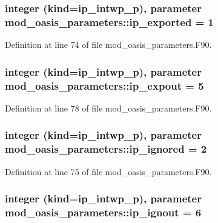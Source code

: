 \hypertarget{classmod__oasis__parameters_a0f729cda95773cdc8df800eacdceb606}{
\subsubsection[{ip\+\_\+exported}]{\setlength{\rightskip}{0pt plus 5cm}integer (kind=ip\+\_\+intwp\+\_\+p), parameter mod\+\_\+oasis\+\_\+parameters\+::ip\+\_\+exported = 1}}\label{classmod__oasis__parameters_a0f729cda95773cdc8df800eacdceb606}


Definition at line 74 of file mod\+\_\+oasis\+\_\+parameters.\+F90.

\hypertarget{classmod__oasis__parameters_ae91d5161b091e1f07e6ee64a38514df6}{
\subsubsection[{ip\+\_\+expout}]{\setlength{\rightskip}{0pt plus 5cm}integer (kind=ip\+\_\+intwp\+\_\+p), parameter mod\+\_\+oasis\+\_\+parameters\+::ip\+\_\+expout = 5}}\label{classmod__oasis__parameters_ae91d5161b091e1f07e6ee64a38514df6}


Definition at line 78 of file mod\+\_\+oasis\+\_\+parameters.\+F90.

\hypertarget{classmod__oasis__parameters_ae3733a399c07b165b5ad19543ca1d2a2}{
\subsubsection[{ip\+\_\+ignored}]{\setlength{\rightskip}{0pt plus 5cm}integer (kind=ip\+\_\+intwp\+\_\+p), parameter mod\+\_\+oasis\+\_\+parameters\+::ip\+\_\+ignored = 2}}\label{classmod__oasis__parameters_ae3733a399c07b165b5ad19543ca1d2a2}


Definition at line 75 of file mod\+\_\+oasis\+\_\+parameters.\+F90.

\hypertarget{classmod__oasis__parameters_a4d283e27ebb49e8d97a35842f10d9aec}{
\subsubsection[{ip\+\_\+ignout}]{\setlength{\rightskip}{0pt plus 5cm}integer (kind=ip\+\_\+intwp\+\_\+p), parameter mod\+\_\+oasis\+\_\+parameters\+::ip\+\_\+ignout = 6}}\label{classmod__oasis__parameters_a4d283e27ebb49e8d97a35842f10d9aec}


